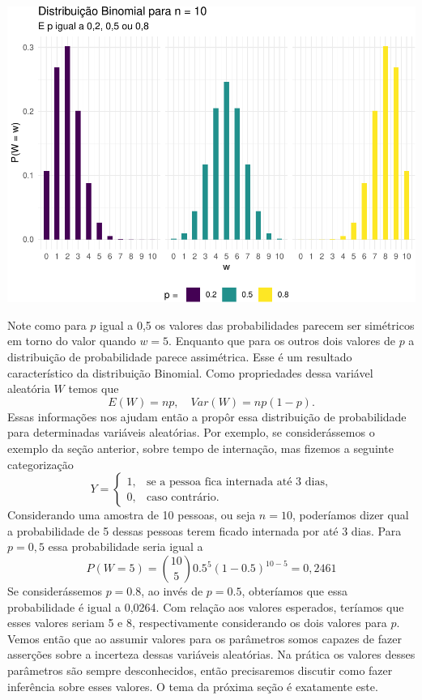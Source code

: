 \documentclass[]{book}
\begin{document}
\begin{center}\includegraphics[width=0.8\linewidth]{notas_livro_files/figure-latex/graf10-1} \end{center}

Note como para \(p\) igual a 0,5 os valores das probabilidades parecem ser simétricos em torno do valor quando \(w = 5\). Enquanto que para os outros dois valores de \(p\) a distribuição de probabilidade parece assimétrica. Esse é um resultado característico da distribuição Binomial. Como propriedades dessa variável aleatória \(W\) temos que
\[
E(W) = np, \quad Var(W) = np(1-p).
\]
Essas informações nos ajudam então a propôr essa distribuição de probabilidade para determinadas variáveis aleatórias. Por exemplo, se considerássemos o exemplo da seção anterior, sobre tempo de internação, mas fizemos a seguinte categorização
\[
Y = \begin{cases}
1, & \mbox{se a pessoa fica internada até 3 dias}, \\
0, & \mbox{caso contrário}.
    \end{cases}
\]
Considerando uma amostra de 10 pessoas, ou seja \(n = 10\), poderíamos dizer qual a probabilidade de 5 dessas pessoas terem ficado internada por até 3 dias. Para \(p = 0,5\) essa probabilidade seria igual a
\[
P(W = 5) = {10 \choose 5} 0.5^5 (1-0.5)^{10 - 5} = 0,2461
\]
Se considerássemos \(p=0.8\), ao invés de \(p = 0.5\), obteríamos que essa probabilidade é igual a 0,0264. Com relação aos valores esperados, teríamos que esses valores seriam 5 e 8, respectivamente considerando os dois valores para \(p\). Vemos então que ao assumir valores para os parâmetros somos capazes de fazer asserções sobre a incerteza dessas variáveis aleatórias. Na prática os valores desses parâmetros são sempre desconhecidos, então precisaremos discutir como fazer inferência sobre esses valores. O tema da próxima seção é exatamente este.
\end{document}
